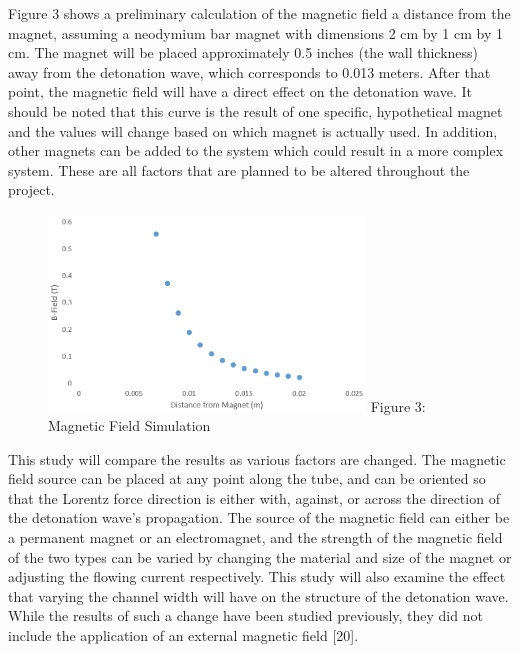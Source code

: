 \documentclass[preview,12pt]{article}
\begin{document}
\newpage
\indent Figure 3 shows a preliminary calculation of the magnetic field a distance from the magnet, assuming a neodymium bar magnet with dimensions 2 cm by 1 cm by 1 cm.  The magnet will be placed approximately 0.5 inches (the wall thickness) away from the detonation wave, which corresponds to 0.013 meters.  After that point, the magnetic field will have a direct effect on the detonation wave.  It should be noted that this curve is the result of one specific, hypothetical magnet and the values will change based on which magnet is actually used.  In addition, other magnets can be added to the system which could result in a more complex system.  These are all factors that are planned to be altered throughout the project.  
\begin{figure}[h]
    \begin{center}
        \includegraphics[width=0.75\textwidth]{Bfield.PNG}
        \newline Figure 3: Magnetic Field Simulation
    \end{center}
\end{figure}
\newline
\indent This study will compare the results as various factors are changed.  The magnetic field source can be placed at any point along the tube, and can be oriented so that the Lorentz force direction is either with, against, or across the direction of the detonation wave's propagation.  The source of the magnetic field can either be a permanent magnet or an electromagnet, and the strength of the magnetic field of the two types can be varied by changing the material and size of the magnet or adjusting the flowing current respectively. 
\newline
\indent This study will also examine the effect that varying the channel width will have on the structure of the detonation wave.  While the results of such a change have been studied previously, they did not include the application of an external magnetic field [20].
\end{document}
